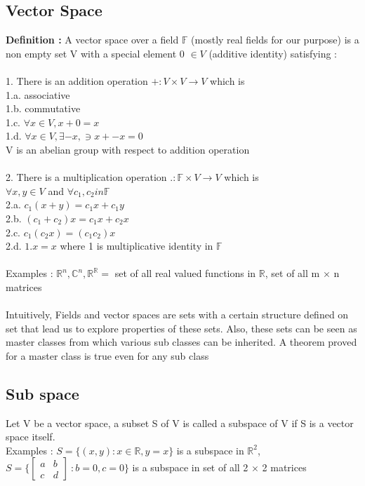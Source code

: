 \documentclass{article}
\begin{document}
    \subsection{Vector Space}
    \textbf{Definition : } A vector space over a field $\mathbb{F}$ (mostly real fields for our purpose) is a non empty set V with a special element 0 $\in V$ (additive identity) satisfying :  \\ \\
    1. There is an addition operation $ + : V \times V \rightarrow V $ which is\\
    1.a. associative \\
    1.b. commutative \\
    1.c. $\forall x \in V , x + 0 = x$ \\
    1.d. $\forall x \in V , \exists -x , \ni x + -x = 0$ \\
    V is an abelian group with respect to addition operation \\ \\
    2. There is a multiplication operation $ . : \mathbb{F} \times V \rightarrow V $ which is\\
    $\forall x, y \in V$ and $\forall c_1, c_2 in \mathbb{F} $ \\
    2.a. $c_1 (x + y) = c_1x + c_1y$ \\
    2.b. $(c_1 + c_2)x = c_1x + c_2x$ \\ 
    2.c. $c_1(c_2 x) = (c_1c_2)x $ \\
    2.d. $1.x = x$ where 1 is multiplicative identity in $\mathbb{F}$ \\ \\
    Examples : $\mathbb{R}^n, \mathbb{C}^n, \mathbb{R}^\mathbb{R} = $ set of all real valued functions in $\mathbb{R}$, set of all m $\times$ n matrices \\ \\ 
    Intuitively, Fields and vector spaces are sets with a certain structure defined on set that lead us to explore properties of these sets. Also, these sets can be seen as master classes from which various sub classes can be inherited. A theorem proved for a master class is true even for any sub class
    \subsection{Sub space}
    Let V be a vector space, a subset S of V is called a subspace of V if S is a vector space itself. \\
    Examples : $S=\{(x,y) : x\in \mathbb{R} , y=x \}$ is a subspace in $\mathbb{R}^2$, \\
    $S=\{ \begin{bmatrix} a & b \\ c & d \end{bmatrix}\ : b = 0, c = 0\}$ is a subspace in set of all 2 $\times$ 2 matrices 
\end{document}
